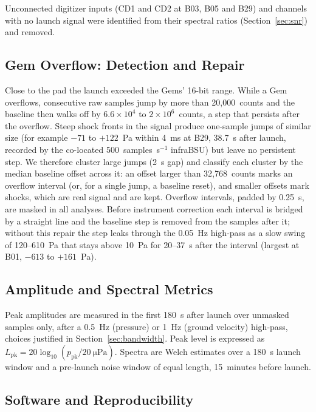 \documentclass[]{seismica}
\begin{document}
Unconnected digitizer inputs (CD1 and CD2 at B03, B05 and B29) and
channels with no launch signal were identified from their spectral
ratios (Section~\ref{sec:snr}) and removed.

\subsection{Gem Overflow: Detection and Repair}
\label{sec:overflow}

Close to the pad the launch exceeded the Gems' 16-bit range. While a
Gem overflows, consecutive raw samples jump by more than 20{,}000~counts
and the baseline then walks off by $6.6\times10^{4}$ to
$2\times10^{6}$~counts, a step that persists after the overflow. Steep
shock fronts in the signal produce one-sample jumps of similar size
(for example $-71$ to $+122$~Pa within 4~ms at B29, 38.7~s after
launch, recorded by the co-located 500~samples~s$^{-1}$ infraBSU) but leave no persistent step.
We therefore cluster large jumps (2~s gap) and classify each cluster by
the median baseline offset across it: an offset larger than
32{,}768~counts marks an overflow interval (or, for a single jump, a
baseline reset), and smaller offsets mark shocks, which are real signal
and are kept. Overflow intervals, padded by 0.25~s, are masked in all
analyses. Before instrument correction each interval is bridged by a
straight line and the baseline step is removed from the samples after
it; without this repair the step leaks through the 0.05~Hz high-pass as
a slow swing of 120--610~Pa that stays above 10~Pa for 20--37~s after
the interval (largest at B01, $-613$ to $+161$~Pa).

\subsection{Amplitude and Spectral Metrics}

Peak amplitudes are measured in the first 180~s after launch over
unmasked samples only, after a 0.5~Hz (pressure) or 1~Hz (ground
velocity) high-pass, choices justified in Section~\ref{sec:bandwidth}.
Peak level is expressed as $L_\text{pk} =
20\log_{10}(p_\text{pk}/\SI{20}{\micro\pascal})$. Spectra are Welch
estimates over a 180~s launch window and a pre-launch noise window of
equal length, 15~minutes before launch.

\subsection{Software and Reproducibility}
\label{sec:software}
\end{document}
